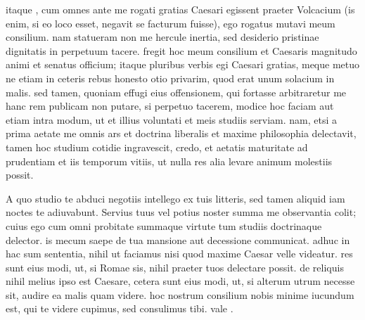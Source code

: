  itaque , cum omnes ante me rogati gratias Caesari egissent praeter Volcacium (is enim, si eo loco esset, negavit se facturum fuisse), ego rogatus mutavi meum consilium. nam statueram non me hercule inertia, sed desiderio pristinae dignitatis in perpetuum tacere. fregit hoc meum consilium et Caesaris magnitudo animi et senatus officium; itaque pluribus verbis egi Caesari gratias, meque metuo ne etiam in ceteris rebus honesto otio privarim, quod erat unum solacium in malis. sed tamen, quoniam effugi eius offensionem, qui fortasse arbitraretur me hanc rem publicam non putare, si perpetuo tacerem, modice hoc faciam aut etiam intra modum, ut et illius voluntati et meis studiis serviam. nam, etsi a prima aetate me omnis ars et doctrina liberalis et maxime philosophia delectavit, tamen hoc studium cotidie ingravescit, credo, et aetatis maturitate ad prudentiam et iis temporum vitiis, ut nulla res alia levare animum molestiis possit.

 A quo studio te abduci negotiis intellego ex tuis litteris, sed tamen aliquid iam noctes te adiuvabunt. Servius tuus vel potius noster summa me observantia colit; cuius ego cum omni probitate summaque virtute tum studiis doctrinaque delector. is mecum saepe de tua mansione aut decessione communicat. adhuc in hac sum sententia, nihil ut faciamus nisi quod maxime Caesar velle videatur. res sunt eius modi, ut, si Romae sis, nihil praeter tuos delectare possit. de reliquis nihil melius ipso est Caesare, cetera sunt eius modi, ut, si alterum utrum necesse sit, audire ea malis quam videre. hoc nostrum consilium nobis minime iucundum est, qui te videre cupimus, sed consulimus tibi. vale .
